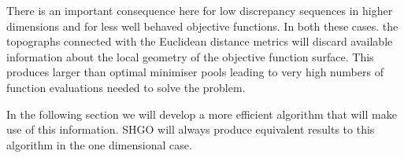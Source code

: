 There is an important consequence here for low discrepancy sequences in higher dimensions and for less well behaved objective functions. In both these cases. the topographs connected with the Euclidean distance metrics will discard available information about the local geometry of the objective function surface. This produces larger than optimal minimiser pools leading to very high numbers of function evaluations needed to solve the problem.








In the following section we will develop a more efficient algorithm that will make use of this information. SHGO will always produce equivalent results to this algorithm in the one dimensional case.

